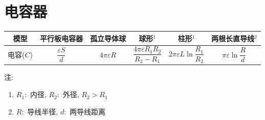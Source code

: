 \documentclass[UTF8]{ctexart}
\begin{document}
\section{电容器}

\renewcommand{\arraystretch}{2.5}
\begin{table}[H]
\centering
\makegapedcells
\begin{tabular}{c|c|c|c|c|c}
    \hline
    模型 & 平行板电容器 & 孤立导体球 & 球形$ ^{\text{1}} $ & 柱形$ ^{\text{1}} $ & 两根长直导线$ ^{\text{2}} $ \\
    
    \hline
    电容($ C $) & $ \dfrac{\varepsilon S}{d} $ & $ 4 \pi \varepsilon R $ & $ \dfrac{4 \pi \varepsilon R_1 R_2}{R_2 - R_1} $ & $ 2 \pi \varepsilon L \ln \dfrac{R_1}{R_2} $ & $ \pi \varepsilon \ln \dfrac{R}{d} $ \\

    \hline
\end{tabular}
\end{table}
注:
\begin{enumerate}
    \item $ R_1: $ 内径, $ R_2: $ 外径, $ R_2 > R_1 $
    \item $ R: $ 导线半径, $ d: $ 两导线距离
\end{enumerate}
\end{document}
